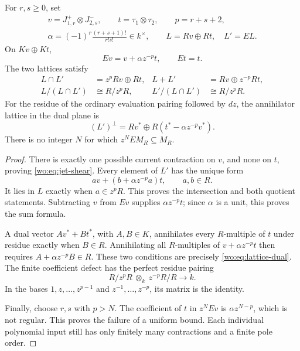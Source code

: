 \begin{proposition}\label{wo:prop:lattice}
For \(r,s\ge0\), set
\[
 \begin{gathered}
 v=J_{1,r}^+\otimes J_{2,s}^-,\qquad
 t=\tau_1\otimes\tau_2,\qquad p=r+s+2,\\
 \alpha=(-1)^r\frac{(r+s+1)!}{r!s!}\in k^\times,
 \qquad L=Rv\oplus Rt,\quad L'=EL.
 \end{gathered}
\]
On \(Kv\oplus Kt\),
\begin{equation}\label{wo:eq:jet-shear}
 Ev=v+\alpha z^{-p}t,\qquad Et=t.
\end{equation}
The two lattices satisfy
\begin{align}
 L\cap L'&=z^pRv\oplus Rt,&
 L+L'&=Rv\oplus z^{-p}Rt,\label{wo:eq:lattice-sum}\\
 L/(L\cap L')&\cong R/z^pR,&
 L'/(L\cap L')&\cong R/z^pR.\label{wo:eq:lattice-quotients}
\end{align}
For the residue of the ordinary evaluation pairing followed by
\(dz\), the annihilator lattice in the dual plane is
\begin{equation}\label{wo:eq:lattice-dual}
 (L')^\perp=Rv^*\oplus R(t^*-\alpha z^{-p}v^*).
\end{equation}
There is no integer \(N\) for which \(z^NEM_R\subseteq M_R\).
\end{proposition}
\begin{proof}
There is exactly one possible current contraction on \(v\), and
none on \(t\), proving \eqref{wo:eq:jet-shear}.  Every element of
\(L'\) has the unique form
\[
 av+(b+\alpha z^{-p}a)t,\qquad a,b\in R.
\]
It lies in \(L\) exactly when \(a\in z^pR\).  This proves
the intersection and both quotient statements.  Subtracting \(v\)
from \(Ev\) supplies \(\alpha z^{-p}t\); since \(\alpha\)
is a unit, this proves the sum formula.

A dual vector \(Av^*+Bt^*\), with \(A,B\in K\), annihilates
every \(R\)-multiple of \(t\) under residue exactly when
\(B\in R\).  Annihilating all \(R\)-multiples of
\(v+\alpha z^{-p}t\) then requires
\(A+\alpha z^{-p}B\in R\).  These two conditions are precisely
\eqref{wo:eq:lattice-dual}.  The finite coefficient defect has the
perfect residue pairing
\[
 R/z^pR\ \otimes_k\ z^{-p}R/R\longrightarrow k.
\]
In the bases \(1,z,\ldots,z^{p-1}\) and
\(z^{-1},\ldots,z^{-p}\), its matrix is the identity.

Finally, choose \(r,s\) with \(p>N\).  The coefficient of
\(t\) in \(z^NEv\) is \(\alpha z^{N-p}\), which is not
regular.  This proves the failure of a uniform bound.  Each
individual polynomial input still has only finitely many contractions
and a finite pole order.
\end{proof}


